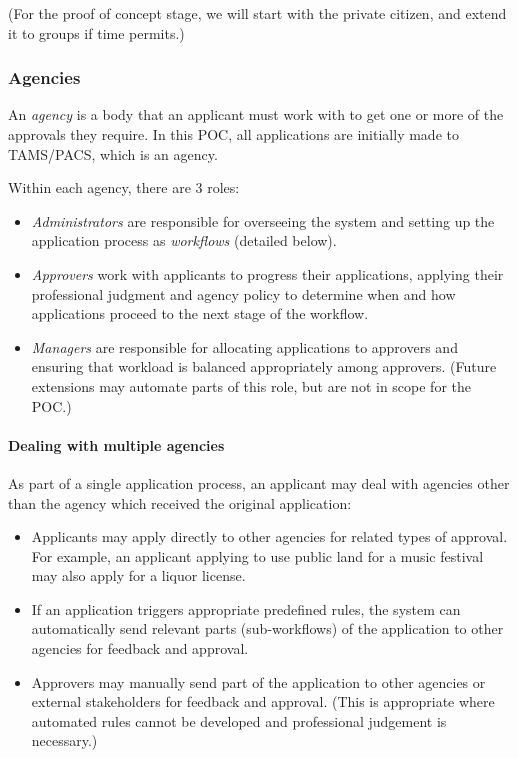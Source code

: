 \documentclass[12pt,a4paper,twosided]{article}
\begin{document}
(For the proof of concept stage, we will start with the private citizen,
and extend it to groups if time permits.)

\subsubsection{Agencies}

An \emph{agency} is a body that an applicant must work with to get one
or more of the approvals they require. In this POC, all applications are
initially made to TAMS/PACS, which is an agency.

Within each agency, there are 3 roles:

\begin{itemize}
\itemsep1pt\parskip0pt
\item
  \emph{Administrators} are responsible for overseeing the system and
  setting up the application process as \emph{workflows} (detailed
  below).
\item
  \emph{Approvers} work with applicants to progress their applications,
  applying their professional judgment and agency policy to determine
  when and how applications proceed to the next stage of the workflow.
\item
  \emph{Managers} are responsible for allocating applications to
  approvers and ensuring that workload is balanced appropriately among
  approvers. (Future extensions may automate parts of this role, but are
  not in scope for the POC.)
\end{itemize}

\paragraph{Dealing with multiple agencies}

As part of a single application process, an applicant may deal with
agencies other than the agency which received the original application:

\begin{itemize}
\itemsep1pt\parskip0pt
\item
  Applicants may apply directly to other agencies for related types of
  approval. For example, an applicant applying to use public land for a
  music festival may also apply for a liquor license.
\item
  If an application triggers appropriate predefined rules, the system
  can automatically send relevant parts (sub-workflows) of the
  application to other agencies for feedback and approval.
\item
  Approvers may manually send part of the application to other agencies
  or external stakeholders for feedback and approval. (This is
  appropriate where automated rules cannot be developed and professional
  judgement is necessary.)
\end{itemize}
\end{document}
